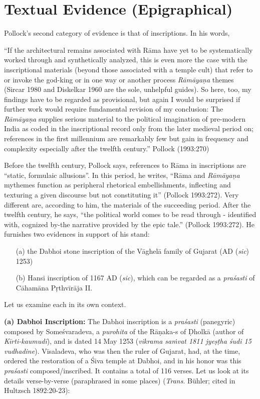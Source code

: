 \section{Textual Evidence (Epigraphical)}\label{sec3.2}

Pollock’s second category of evidence is that of inscriptions. In his words, 

\begin{myquote}
“If the architectural remains associated with Rāma have yet to be systematically worked through and synthetically analyzed, this is even more the case with the inscriptional materials (beyond those associated with a temple cult) that refer to or invoke the god-king or in one way or another process {\sl Rāmāyaṇa} themes (Sircar 1980 and Diskelkar 1960 are the sole, unhelpful guides). So here, too, my findings have to be regarded as provisional, but again I would be surprised if further work would require fundamental revision of my conclusion: The {\sl Rāmāyaṇa} supplies serious material to the political imagination of pre-modern India as coded in the inscriptional record only from the later medieval period on; references in the first millennium are remarkably few but gain in frequency and complexity especially after the twelfth century.”
\hfill Pollock (1993:270)
\end{myquote}

Before the twelfth century, Pollock says, references to Rāma in inscriptions are “static, formulaic allusions”. In this period, he writes, “Rāma and {\sl Rāmāyaṇa} mythemes function as peripheral rhetorical embellishments, inflecting and texturing a given discourse but not constituting it” (Pollock 1993:272). Very different are, according to him, the materials of the succeeding period. After the twelfth century, he says, “the political world comes to be read through - identified with, cognized by-the narrative provided by the epic tale.” (Pollock 1993:272). He furnishes two evidences in support of his stand: 
\begin{itemize}
\itemsep=0pt
\item[(a)] the Dabhoi stone inscription of the Vāghelā family of Gujarat (AD ({\sl sic}) 1253) 
\item[(b)] Hansi inscription of 1167 AD ({\sl sic}), which can be regarded as a {\sl praśasti} of Cāhamāna Pṛthvīrāja II. 
\end{itemize}
Let us examine each in its own context. 

\smallskip
\noindent
{\bf (a) Dabhoi Inscription:} The Dabhoi inscription is a {\sl praśasti} (panegyric) composed by Someśvaradeva, a {\sl purohita} of the Rāṇaka-s of Ḍholkā (author of {\sl Kīrti-kaumudī}), and is dated 14 May 1253 ({\sl vikrama saṁvat 1811 jyeṣṭha śudi 15 vudhadine}). Vīsaladeva, who was then the ruler of Gujarat, had, at the time, ordered the restoration of a Śiva temple at Dabhoi, and in his honor was this {\sl praśasti} composed/inscribed. It contains a total of 116 verses. Let us look at its details verse-by-verse (paraphrased in some places) ({\sl Trans}. Bühler; cited in Hultzsch 1892:20-23):

